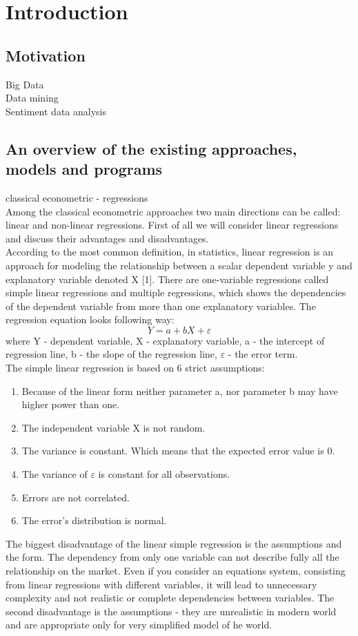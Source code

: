 \documentclass {article}
\begin{document}
\newpage
\section{Introduction}
\subsection{Motivation}
Big Data\\
Data mining\\
Sentiment data analysis
\subsection{An overview of the existing approaches, models and programs}
classical econometric - regressions\\
Among the classical econometric approaches two main directions can be called: linear and non-linear regressions. First of all we will consider linear regressions and discuss their advantages and disadvantages.\\
According to the most common definition, in statistics, linear regression is an approach for modeling the relationship between a scalar dependent variable y and explanatory variable denoted X [1]. There are one-variable regressions called simple linear regressions and multiple regressions, which shows the dependencies of the dependent variable from more than one explanatory variables. The regression equation looks following way:\\
\[Y = a + bX + \varepsilon\]
where Y - dependent variable, X - explanatory variable, a - the intercept of regression line, b - the slope of the regression line, $\varepsilon$ - the error term.\\
The simple linear regression is based on 6 strict assumptions:
\begin{enumerate}
	\item Because of the linear form neither parameter a, nor parameter b may have higher power than one.
	\item The independent variable X is not random.
	\item The variance is constant. Which means that the expected error value is 0.
	\item The variance of $\varepsilon$ is constant for all observations.
	\item Errors are not correlated.
	\item The error's distribution is normal.
\end{enumerate}
The biggest disadvantage of the linear simple regression is the assumptions and the form. The dependency from only one variable can not describe fully all the relationship on the market. Even if you consider an equations system, consisting from linear regressions with different variables, it will lead to unnecessary complexity and not realistic or complete dependencies between variables. The second disadvantage is the assumptions - they are unrealistic in modern world and are appropriate only for very simplified model of he world.\\
\end{document}

